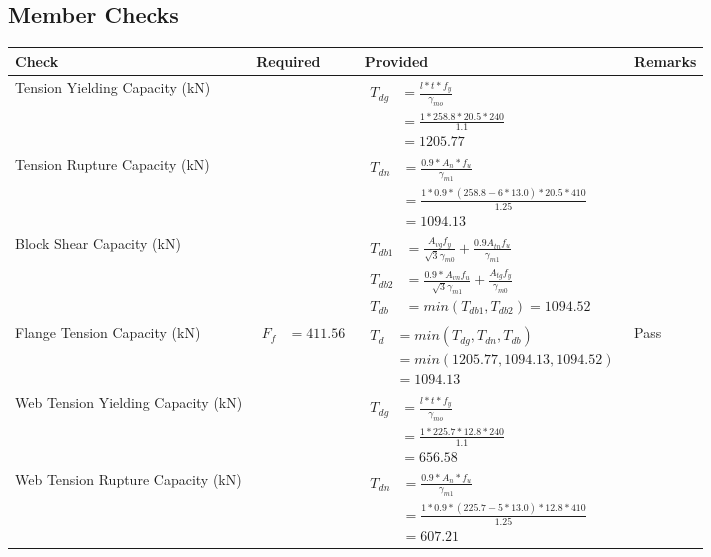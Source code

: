 \documentclass{article}%
\begin{document}
\subsection{Member Checks}%
\label{subsec:MemberChecks}%
\renewcommand{\arraystretch}{1.2}%
\begin{longtable}{|p{4cm}|p{4cm}|p{7cm}|p{1.5cm}|}%
\hline%
\rowcolor{OsdagGreen}%
Check&Required&Provided&Remarks\\%
\hline%
\endhead%
\hline%
Tension Yielding Capacity (kN)&&$\begin{aligned} T_{dg} &= \frac{l*t*f_y}{\gamma_{mo}}\\ &=\frac{1*258.8*20.5*240}{1.1}\\ &=1205.77\end{aligned}$&\\%
\hline%
Tension Rupture Capacity (kN)&&$\begin{aligned} T_{dn} &= \frac{0.9*A_{n}*f_u}{\gamma_{m1}}\\ &=\frac{1*0.9* (258.8-6*13.0)*20.5*410}{1.25}\\ &=1094.13\end{aligned}$&\\%
\hline%
Block Shear Capacity (kN)&&$\begin{aligned}T_{db1} &= \frac{A_{vg} f_{y}}{\sqrt{3} \gamma_{m0}} + \frac{0.9 A_{tn} f_{u}}{\gamma_{m1}}\\ T_{db2} &= \frac{0.9*A_{vn} f_{u}}{\sqrt{3} \gamma_{m1}} + \frac{A_{tg} f_{y}}{\gamma_{m0}}\\ T_{db} &= min(T_{db1}, T_{db2})= 1094.52\end{aligned}$&\\%
\hline%
Flange Tension Capacity (kN)&$\begin{aligned} F_f &=411.56\end{aligned}$&$\begin{aligned} T_d &= min(T_{dg},T_{dn},T_{db})\\ &= min(1205.77,1094.13,1094.52)\\ &=1094.13\end{aligned}$&Pass\\%
\hline%
Web Tension Yielding Capacity (kN)&&$\begin{aligned} T_{dg} &= \frac{l*t*f_y}{\gamma_{mo}}\\ &=\frac{1*225.7*12.8*240}{1.1}\\ &=656.58\end{aligned}$&\\%
\hline%
Web Tension Rupture Capacity (kN)&&$\begin{aligned} T_{dn} &= \frac{0.9*A_{n}*f_u}{\gamma_{m1}}\\ &=\frac{1*0.9* (225.7-5*13.0)*12.8*410}{1.25}\\ &=607.21\end{aligned}$&\\%

\end{longtable}
\end{document}
